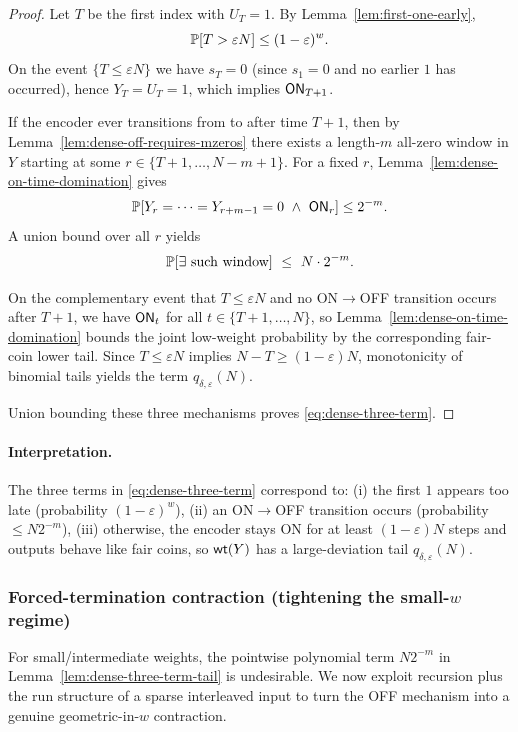 \begin{proof}
Let $T$ be the first index with $U_T=1$. By Lemma~\ref{lem:first-one-early},
\[
\mathbb{P}[T>\varepsilon N]\le (1-\varepsilon)^w.
\]
On the event $\{T\le \varepsilon N\}$ we have $s_T=0$ (since $s_1=0$ and no earlier $1$ has occurred),
hence $Y_T=U_T=1$, which implies $\mathsf{ON}_{T+1}$.

If the encoder ever transitions from \ON to \OFF after time $T+1$, then by Lemma~\ref{lem:dense-off-requires-mzeros}
there exists a length-$m$ all-zero window in $Y$ starting at some $r\in\{T+1,\dots,N-m+1\}$.
For a fixed $r$, Lemma~\ref{lem:dense-on-time-domination} gives
\[
\PP[Y_r=\cdots=Y_{r+m-1}=0 \ \wedge\ \ON_r]\le 2^{-m}.
\]
A union bound over all $r$ yields
\[
\PP[\exists\ \text{such window}] \ \le\ N\cdot 2^{-m}.
\]

On the complementary event that $T\le \varepsilon N$ and no ON$\to$OFF transition occurs after $T+1$,
we have $\mathsf{ON}_t$ for all $t\in\{T+1,\dots,N\}$, so Lemma~\ref{lem:dense-on-time-domination} bounds the joint
low-weight probability by the corresponding fair-coin lower tail.
Since $T\le \varepsilon N$ implies $N-T\ge (1-\varepsilon)N$, monotonicity of binomial tails yields the term
$q_{\delta,\varepsilon}(N)$.

Union bounding these three mechanisms proves \eqref{eq:dense-three-term}.
\end{proof}

\paragraph{Interpretation.}
The three terms in \eqref{eq:dense-three-term} correspond to:
(i) the first $1$ appears too late (probability $(1-\varepsilon)^w$),
(ii) an ON$\to$OFF transition occurs (probability $\le N2^{-m}$),
(iii) otherwise, the encoder stays ON for at least $(1-\varepsilon)N$ steps and outputs behave like fair coins, so
$\mathsf{wt}(Y)$ has a large-deviation tail $q_{\delta,\varepsilon}(N)$.

\subsubsection{Forced-termination contraction (tightening the small-$w$ regime)}
\label{subsec:inner-dense-forced-termination}

For small/intermediate weights, the pointwise polynomial term $N2^{-m}$ in Lemma~\ref{lem:dense-three-term-tail}
is undesirable. We now exploit recursion plus the run structure of a sparse interleaved input to turn the OFF mechanism
into a genuine geometric-in-$w$ contraction.

